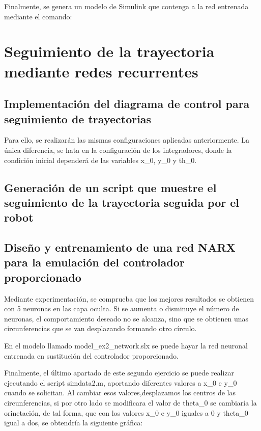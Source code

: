 \documentclass{article}
\begin{document}
\newpage
Finalmente, se genera un modelo de Simulink que contenga a la red entrenada mediante el comando: 

\section{Seguimiento de la trayectoria mediante redes recurrentes}

\subsection*{Implementación del diagrama de control para seguimiento de trayectorias}

Para ello, se realizarán las mismas configuraciones aplicadas anteriormente. La única diferencia, se hata en la configuración de los integradores, donde la condición inicial dependerá de las variables x\_0, y\_0 y th\_0.

\subsection*{Generación de un script que muestre el seguimiento de la trayectoria seguida por el robot}



\subsection*{Diseño y entrenamiento de una red NARX para la emulación del controlador proporcionado}



Mediante experimentación, se comprueba que los mejores resultados se obtienen con 5 neuronas en las capa oculta. Si se aumenta o disminuye el número de neuronas, el comportamiento deseado no se alcanza, sino que se obtienen unas circunferencias que se van desplazando formando otro círculo. 

En el modelo llamado model\_ex2\_network.slx se puede hayar la red neuronal entrenada en sustitución del controlador proporcionado.

Finalmente, el último apartado de este segundo ejercicio se puede realizar ejecutando el script simdata2.m, aportando diferentes valores a x\_0 e y\_0 cuando se solicitan. Al cambiar esos valores,desplazamos los centros de las circunferencias, si por otro lado se modificara el valor de theta\_0 se cambiaría la orinetación, de tal forma, que con los valores x\_0 e y\_0 iguales a 0 y theta\_0 igual a dos, se obtendría la siguiente gráfica:
\end{document}
